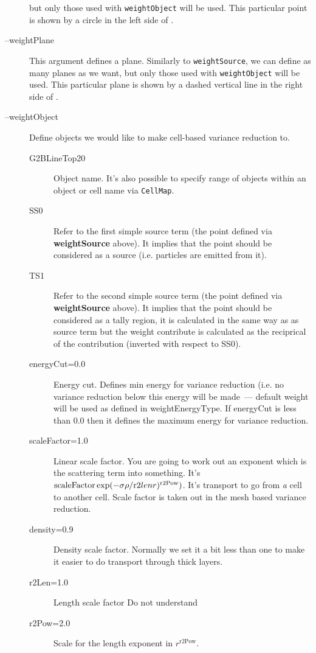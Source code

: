 \begin{description}
  but only those used with {\tt weightObject} will be used.
  This particular point is shown by a circle in the left side of .
\item[--weightPlane] This argument defines a plane. Similarly to {\tt weightSource}, we can define as many planes as we want,
  but only those used with {\tt weightObject} will be used.
  This particular plane is shown by a dashed vertical line in the right side of .
\item[--weightObject] Define objects we would like to make cell-based variance reduction to.
  \begin{description}
  \item[G2BLineTop20] Object name.  It's also possible to specify range of objects within an object or cell name via {\tt CellMap}.
  \item[SS0] Refer to the first simple source term (the point defined via {\bf weightSource} above).
    It implies that the point should be considered as a source (i.e. particles are emitted from it).
  \item[TS1] Refer to the second simple source term (the point defined via {\bf weightSource} above).
    It implies that the point should be considered as a tally region, it is calculated in the same way as
    as source term but the weight contribute is calculated as the reciprical of the contribution (inverted with respect to SS0).
    \item[energyCut=0.0] Energy cut. Defines min energy for variance reduction (i.e. no variance reduction below this energy will be made~--- default weight will be used as defined in weightEnergyType. If energyCut is less than 0.0 then it defines the maximum energy for variance reduction.
    \item[scaleFactor=1.0] Linear scale factor. You are going to work out an exponent which is
      the scattering term into something. It's $ \textrm{scaleFactor} \exp(-\sigma \rho /
           {\textrm r2len} r)^{\textrm{r2Pow}} )$.
      It's transport to go from {\em a} cell to another cell. \alert{Scale factor is taken out in the mesh based variance reduction.}
    \item[density=0.9] Density scale factor. Normally we set it a bit less than one to make it easier to do transport through thick layers.
    \item[r2Len=1.0] Length scale factor \alert{Do not understand}
    \item[r2Pow=2.0] Scale for the length exponent in $r^{\text{r2Pow}}$.
  \end{description}


\end{description}
